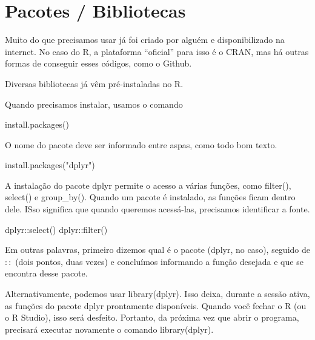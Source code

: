 \documentclass[
]{book}
\newenvironment{Shaded}{\begin{snugshade}}{\end{snugshade}}
\newcommand{\FunctionTok}[1]{\textcolor[rgb]{0.00,0.00,0.00}{#1}}
\newcommand{\NormalTok}[1]{#1}
\newcommand{\SpecialCharTok}[1]{\textcolor[rgb]{0.00,0.00,0.00}{#1}}
\newcommand{\StringTok}[1]{\textcolor[rgb]{0.31,0.60,0.02}{#1}}
\begin{document}
\hypertarget{pacotes-bibliotecas}{%
\chapter{Pacotes / Bibliotecas}\label{pacotes-bibliotecas}}

Muito do que precisamos usar já foi criado por alguém e disponibilizado na internet. No caso do R, a plataforma ``oficial'' para isso é o CRAN, mas há outras formas de conseguir esses códigos, como o Github.

Diversas bibliotecas já vêm pré-instaladas no R.

Quando precisamos instalar, usamos o comando

\begin{Shaded}
\begin{Highlighting}[]
\FunctionTok{install.packages}\NormalTok{()}
\end{Highlighting}
\end{Shaded}

O nome do pacote deve ser informado entre aspas, como todo bom texto.

\begin{Shaded}
\begin{Highlighting}[]
\FunctionTok{install.packages}\NormalTok{(}\StringTok{"dplyr"}\NormalTok{)}
\end{Highlighting}
\end{Shaded}

A instalação do pacote dplyr permite o acesso a várias funções, como filter(), select() e group\_by(). Quando um pacote é instalado, as funções ficam dentro dele. ISso significa que quando queremos acessá-las, precisamos identificar a fonte.

\begin{Shaded}
\begin{Highlighting}[]
\NormalTok{dplyr}\SpecialCharTok{::}\FunctionTok{select}\NormalTok{()}
\NormalTok{dplyr}\SpecialCharTok{::}\FunctionTok{filter}\NormalTok{()}
\end{Highlighting}
\end{Shaded}

Em outras palavras, primeiro dizemos qual é o pacote (dplyr, no caso), seguido de \(::\) (dois pontos, duas vezes) e concluímos informando a função desejada e que se encontra desse pacote.

Alternativamente, podemos usar library(dplyr). Isso deixa, durante a sessão ativa, as funções do pacote dplyr prontamente disponíveis. Quando você fechar o R (ou o R Studio), isso será desfeito. Portanto, da próxima vez que abrir o programa, precisará executar novamente o comando library(dplyr).
\end{document}
